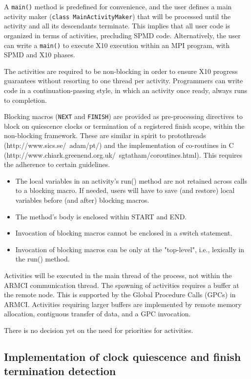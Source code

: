 A {\tt main()} method is predefined for convenience, and the user
defines a main activity maker ({\tt class MainActivityMaker}) that
will be processed until the activity and all its descendants
terminate. This implies that all user code is organized in terms of
activities, precluding SPMD code. Alternatively, the user can write a
{\tt main()} to execute X10 execution within an MPI program, with SPMD and
X10 phases.

The activities are required to be non-blocking in order to ensure X10
progress guarantees without resorting to one thread per activity.
Programmers can write code in a continuation-passing style, in which
an activity once ready, always runs to completion. 

Blocking macros ({\tt NEXT} and {\tt FINISH}) are provided as pre-processing
directives to block on quiescence clocks or termination of a
registered finish scope, within the non-blocking framework. These are
similar in spirit to protothreads (http://www.sics.se/~adam/pt/) and
the implementation of co-routines in C
(http://www.chiark.greenend.org.uk/~sgtatham/coroutines.html). This
requires the adherence to certain guidelines.

\begin{itemize}
\item The local variables in an activity's run() method are not
  retained across calls to a blocking macro. If needed, users will
  have to save (and restore) local variables before (and after)
  blocking macros.  
\item The method's body is enclosed within START and END.  
\item Invocation of blocking macros cannot be enclosed in a switch
  statement. 
\item Invocation of blocking macros can be only at the "top-level",
  i.e., lexically in the run() method.
\end{itemize}

Activities will be executed in the main thread of the process, not
within the ARMCI communication thread. The spawning of activities
requires a buffer at the remote node. This is supported by the Global
Procedure Calls (GPCs) in ARMCI. Activities requiring larger buffers
are implemented by remote memory allocation, contiguous transfer of
data, and a GPC invocation.

There is no decision yet on the need for priorities for activities.

\subsection{Implementation of clock quiescence and finish termination
      detection}

